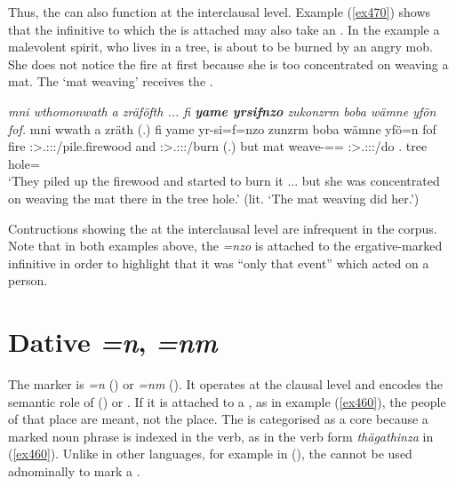 Thus, the   can also function at the interclausal level. Example (\ref{ex470}) shows that the infinitive to which the  is attached may also take an . In the example a malevolent spirit, who lives in a tree, is about to be burned by an angry mob. She does not notice the fire at first because she is too concentrated on weaving a mat. The `mat weaving' receives the .

\begin{exe}
	\ex \emph{mni wthomonwath a zräföfth ... fi \textbf{yame yrsifnzo} zukonzrm boba wämne yfön fof.}
	\gll mni wwath a zräth (.) fi yame yr-si=f=nzo zunzrm boba wämne yfö=n fof\\
	fire \Stpl:\Sbj>\Tsg.\F:\Obj:\Pst:\Ipfv/pile.firewood and \Stpl:\Sbj>\Tsg.\F:\Obj:\Irr:\Pfv/burn (.) but mat weave-\Nmlz=\Erg={\Only} \Stsg:\Sbj>\Tsg.\F:\Obj:\Pst:\Dur/do \Med.{\Abl} tree hole={\Loc} {\Emph}\\
	\trans `They piled up the firewood and started to burn it ... but she was concentrated on weaving the mat there in the tree hole.' (lit. `The mat weaving did her.')\\
	\label{ex470}
\end{exe}

Contructions showing the  at the interclausal level are infrequent in the corpus. Note that in both examples above, the   \emph{=nzo} is attached to the ergative-marked infinitive in order to highlight that it was ``only that event'' which acted on a person.

\section{Dative \emph{=n}, \emph{=nm}} \label{datcase}

The   marker is \emph{=n} (\Sg) or \emph{=nm} (\Nsg). It operates at the clausal level and encodes the semantic role of ()  or . If it is attached to a , as in example (\ref{ex460}), the people of that place are meant, not the place. The  is categorised as a core  because a  marked noun phrase is indexed in the verb, as in the verb form \emph{thägathinza} in (\ref{ex460}). Unlike in other  languages, for example in  (\citealt{Carroll:Ngkolmpu}), the   cannot be used adnominally to mark a .\\
 
